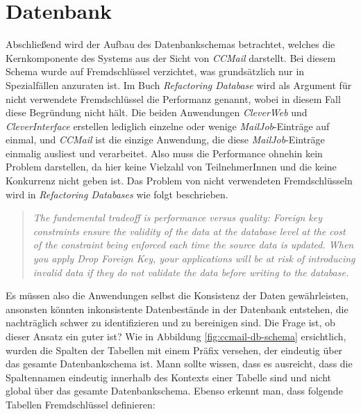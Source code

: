 \section{Datenbank}
\label{sec:ccmail-datanbank}
Abschließend wird der Aufbau des Datenbankschemas betrachtet, welches die Kernkomponente des Systems aus der Sicht von \emph{CCMail} darstellt. Bei diesem Schema wurde auf Fremdschlüssel verzichtet, was grundsätzlich nur in Spezialfällen anzuraten ist.
\newline
\newline 
Im Buch \emph{Refactoring Database} \cite[213]{refactoreDatabase} wird als Argument für nicht verwendete Fremdschlüssel die Performanz genannt, wobei in diesem Fall diese Begründung nicht hält. Die beiden Anwendungen \emph{CleverWeb} und \emph{CleverInterface} erstellen lediglich einzelne oder wenige \emph{MailJob}-Einträge auf einmal, und \emph{CCMail} ist die einzige Anwendung, die diese \emph{MailJob}-Einträge einmalig ausliest und verarbeitet. Also muss die Performance ohnehin kein Problem darstellen, da hier keine Vielzahl von TeilnehmerInnen und die keine Konkurrenz nicht geben ist. Das Problem von nicht verwendeten Fremdschlüsseln wird in \emph{Refactoring Databases} \cite[213]{refactoreDatabase} wie folgt beschrieben.
\begin{quote}
\emph{The fundemental tradeoff is performance versus quality: Foreign key constraints ensure the validity of the data at the database level at the cost of the constraint being enforced each time the source data is updated. When you apply Drop Foreign Key, your applications will be at risk of introducing invalid data if they do not validate the data before writing to the database.}
\end{quote}
Es müssen also die Anwendungen selbst die Konsistenz der Daten gewährleisten, ansonsten könnten inkonsistente Datenbestände in der Datenbank entstehen, die nachträglich schwer zu identifizieren und zu bereinigen sind. Die Frage ist, ob dieser Ansatz ein guter ist?
\newline
\newline
Wie in Abbildung \ref{fig:ccmail-db-schema} ersichtlich, wurden die Spalten der Tabellen mit einem Präfix versehen, der eindeutig über das gesamte Datenbankschema ist. Mann sollte wissen, dass es ausreicht, dass die Spaltennamen eindeutig innerhalb des Kontexts einer Tabelle sind und nicht global über das gesamte Datenbankschema. Ebenso erkennt man, dass folgende Tabellen Fremdschlüssel definieren: 
